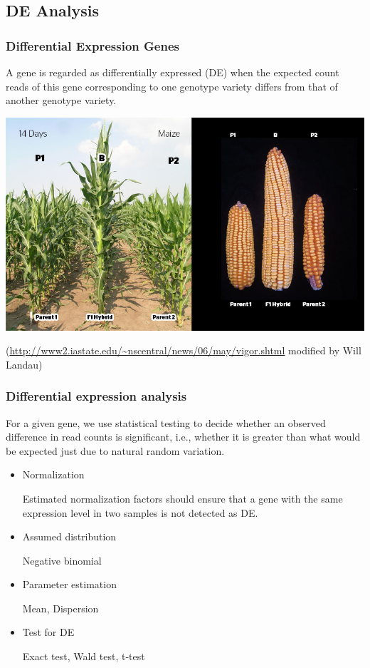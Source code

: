 \documentclass[handout,10pt]{beamer}
\begin{document}
\subsection{DE Analysis}
\begin{frame}
\frametitle{Differential Expression Genes}
\begin{definition}
A gene is regarded as differentially expressed (DE) when the expected count reads of this gene corresponding to one genotype variety differs from that of another genotype variety. 
\end{definition}

\pause
\begin{center}
\includegraphics{heterosis}
\end{center}

{\tiny (\url{http://www2.iastate.edu/~nscentral/news/06/may/vigor.shtml} modified by Will Landau)} 
\end{frame}


\begin{frame}
\frametitle{Differential expression analysis}

\begin{definition}
For a given gene, we use statistical testing to decide whether an observed difference in read counts is significant, i.e., whether it is greater than what would be expected just due to natural random variation.
\end{definition}

\begin{itemize}
\item Normalization

Estimated normalization factors should ensure that a gene with the same expression level in two samples is not detected as DE. 
\item Assumed distribution

Negative binomial

\item Parameter estimation

Mean, Dispersion

\item Test for DE

Exact test, Wald test, t-test

\end{itemize}

\end{frame}
\end{document}
